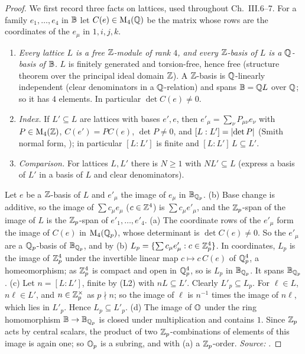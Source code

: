 \begin{lemma}
\end{lemma}
\begin{proof}
We first record three facts on lattices, used throughout Ch.~III.6--7. For a family $e_1,\dots,e_4$ in $\mathbb{B}$ let $C(e)\in\mathrm{M}_4(\mathbb{Q})$ be the matrix
whose rows are the coordinates of the $e_\mu$ in $1,i,j,k$.
\begin{enumerate}[label=(L\arabic*)]
\item \emph{Every lattice $L$ is a free $\mathbb{Z}$-module of rank $4$, and every $\mathbb{Z}$-basis of $L$ is a $\mathbb{Q}$-basis of $\mathbb{B}$.} $L$ is finitely generated and
  torsion-free, hence free (structure theorem over the principal ideal domain $\mathbb{Z}$). A $\mathbb{Z}$-basis is $\mathbb{Q}$-linearly independent (clear denominators in a
  $\mathbb{Q}$-relation) and spans $\mathbb{B}=\mathbb{Q} L$ over $\mathbb{Q}$; so it has $4$ elements. In particular $\det C(e)\ne0$.
\item \emph{Index.} If $L'\subseteq L$ are lattices with bases $e',e$, then $e'_\mu=\sum_\nu P_{\mu\nu}e_\nu$ with $P\in\mathrm{M}_4(\mathbb{Z})$, $C(e')=PC(e)$,
  $\det P\ne0$, and $[L:L']=\lvert\det P\rvert$ (Smith normal form, \cite[§9.6]{Voi}); in particular $[L:L']$ is finite and $[L:L']\,L\subseteq L'$.
\item \emph{Comparison.} For lattices $L,L'$ there is $N\ge1$ with $NL'\subseteq L$ (express a basis of $L'$ in a basis of $L$ and clear denominators).
\end{enumerate}
Let $e$ be a $\mathbb{Z}$-basis of $L$ and $e'_\mu$ the image of $e_\mu$ in $\mathbb{B}_{\mathbb{Q}_p}$.
(b) Base change is additive, so the image of $\sum c_\mu e_\mu$ ($c\in\mathbb{Z}^4$) is $\sum c_\mu e'_\mu$, and the $\mathbb{Z}_p$-span of the image of $L$ is the
$\mathbb{Z}_p$-span of $e'_1,\dots,e'_4$.
(a) The coordinate rows of the $e'_\mu$ form the image of $C(e)$ in $\mathrm{M}_4(\mathbb{Q}_p)$, whose determinant is $\det C(e)\ne0$. So the $e'_\mu$ are a
$\mathbb{Q}_p$-basis of $\mathbb{B}_{\mathbb{Q}_p}$, and by (b) $L_p=\{\sum c_\mu e'_\mu:c\in\mathbb{Z}_p^4\}$. In coordinates, $L_p$ is the image of $\mathbb{Z}_p^4$ under the invertible linear map
$c\mapsto c\,C(e)$ of $\mathbb{Q}_p^4$, a homeomorphism; as $\mathbb{Z}_p^4$ is compact and open in $\mathbb{Q}_p^4$, so is $L_p$ in $\mathbb{B}_{\mathbb{Q}_p}$. It spans $\mathbb{B}_{\mathbb{Q}_p}$.
(c) Let $n=[L:L']$, finite by (L2) with $nL\subseteq L'$. Clearly $L'_p\subseteq L_p$. For $\ell\in L$, $n\ell\in L'$, and $n\in\mathbb{Z}_p^\times$ as $p\nmid n$; so
the image of $\ell$ is $n^{-1}$ times the image of $n\ell$, which lies in $L'_p$. Hence $L_p\subseteq L'_p$.
(d) The image of $\mathbb{O}$ under the ring homomorphism $\mathbb{B}\to\mathbb{B}_{\mathbb{Q}_p}$ is closed under multiplication and contains $1$. Since $\mathbb{Z}_p$ acts by
central scalars, the product of two $\mathbb{Z}_p$-combinations of elements of this image is again one; so $\mathbb{O}_p$ is a subring, and with (a) a $\mathbb{Z}_p$-order.
\emph{Source:} \cite[§§9.3--9.5]{Voi}.
\end{proof}

